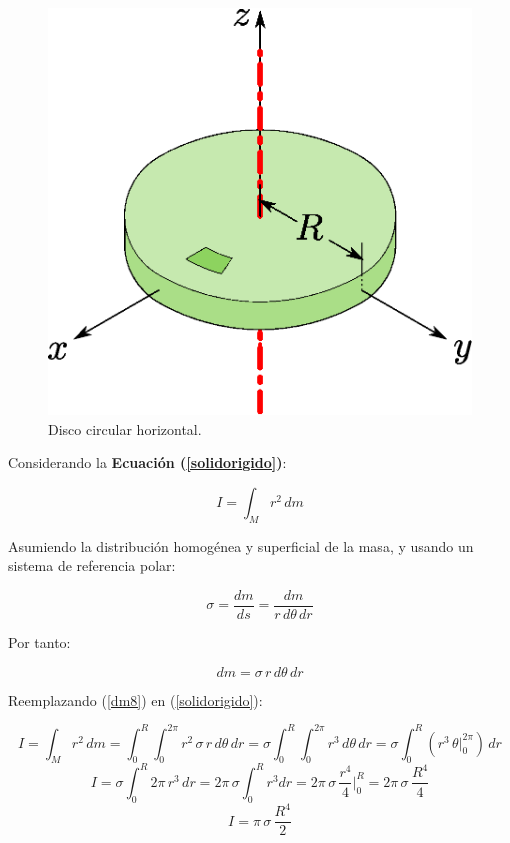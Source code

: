 \documentclass[letter,oneside,11pt]{article}
\begin{document}
\begin{figure}
\centering
\includegraphics[scale=0.5]{resources/f13.eps}
\caption{Disco circular horizontal.}
\label{figura13}
\end{figure}

Considerando la \textbf{Ecuación (\ref{solidorigido})}:

\begin{equation*}
    I = \int_{M} r^2\, dm
\tag{4}
\end{equation*}

Asumiendo la distribución homogénea y superficial de la masa, y usando un
sistema de referencia polar:

\begin{equation*}
    \sigma = \frac{dm}{ds} = \frac{dm}{r\, d\theta\, dr}
\end{equation*}

Por tanto:

\begin{equation}
    dm = \sigma\, r\, d\theta\, dr
\label{dm8}
\end{equation}

Reemplazando (\ref{dm8}) en (\ref{solidorigido}):

\begin{equation*}
    I = \int_{M} r^2\, dm = \int_{0}^{R} \int_{0}^{2\pi} r^2\, \sigma\, r\, d\theta\, dr = \sigma \int_{0}^{R} \int_{0}^{2\pi} r^3\, d\theta\, dr = \sigma \int_{0}^{R} ( r^3\, \theta \Biggr|_{0}^{2\pi} )\, dr
\end{equation*}
\begin{equation*}
    I = \sigma \int_{0}^{R} 2\pi\, r^3\, dr = 2\pi\, \sigma \int_{0}^{R} r^3 dr = 2\pi\, \sigma\, \frac{r^4}{4} \Biggr|_{0}^{R} = 2\pi\, \sigma\, \frac{R^4}{4}
\end{equation*}
\begin{equation}
    I = \pi\, \sigma\, \frac{R^4}{2}
\label{resultado8}
\end{equation}
\end{document}
